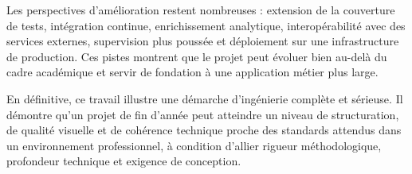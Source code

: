 Les perspectives d'amélioration restent nombreuses : extension de la couverture de tests, intégration continue, enrichissement analytique, interopérabilité avec des services externes, supervision plus poussée et déploiement sur une infrastructure de production. Ces pistes montrent que le projet peut évoluer bien au-delà du cadre académique et servir de fondation à une application métier plus large.

En définitive, ce travail illustre une démarche d'ingénierie complète et sérieuse. Il démontre qu'un projet de fin d'année peut atteindre un niveau de structuration, de qualité visuelle et de cohérence technique proche des standards attendus dans un environnement professionnel, à condition d'allier rigueur méthodologique, profondeur technique et exigence de conception.









